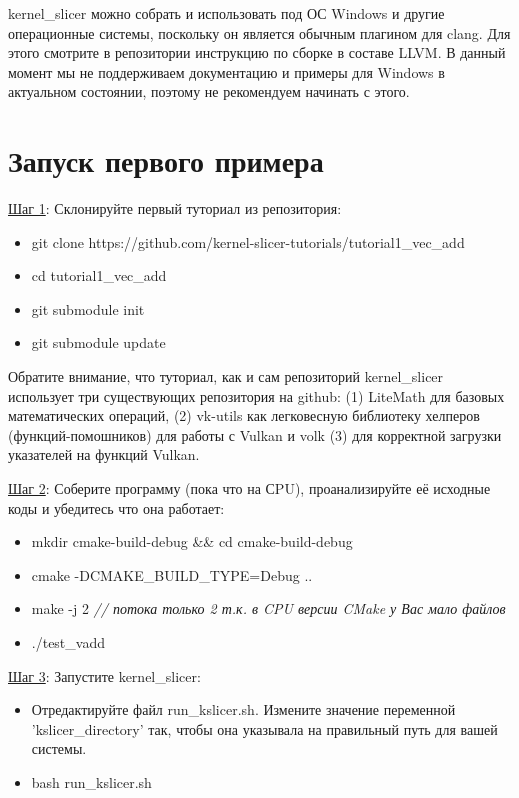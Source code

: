 \documentclass[11pt,fleqn,english,russian]{report} %
\begin{document}
\begin{remark}
	kernel\_slicer можно собрать и использовать под ОС Windows и другие операционные системы, поскольку он является обычным плагином для clang. Для этого смотрите в репозитории инструкцию по сборке в составе LLVM. В данный момент мы не поддерживаем документацию и примеры для Windows в актуальном состоянии, поэтому не рекомендуем начинать с этого. 
\end{remark}

\pagebreak
\section{Запуск первого примера}

\underline{Шаг 1}: Склонируйте первый туториал из репозитория:

\begin{itemize}
	\item git clone https://github.com/kernel-slicer-tutorials/tutorial1\_vec\_add
	\item cd tutorial1\_vec\_add
	\item git submodule init
	\item git submodule update
\end{itemize}

\vspace*{5px}
Обратите внимание, что туториал, как и сам репозиторий kernel\_slicer использует три существующих репозитория на github: (1) LiteMath для базовых математических операций, (2) vk-utils как легковесную библиотеку хелперов (функций-помошников) для работы с Vulkan и volk (3) для корректной загрузки указателей на функций Vulkan.

\vspace*{5px}
\noindent\underline{Шаг 2}: Соберите программу (пока что на СPU), проанализируйте её исходные коды и убедитесь что она работает: 
\begin{itemize}
	\item mkdir cmake-build-debug \&\& cd cmake-build-debug
	\item cmake -DCMAKE\_BUILD\_TYPE=Debug ..
	\item make -j 2 \textit{// потока только 2  т.к. в CPU версии CMake у Вас мало файлов} 
	\item ./test\_vadd 
\end{itemize}

\vspace*{5px}
\noindent\underline{Шаг 3}: Запустите kernel\_slicer:
\begin{itemize}
	\item Отредактируйте файл run\_kslicer.sh. Измените значение переменной 'kslicer\_directory' так, чтобы она указывала на правильный путь для вашей системы.
	\item bash run\_kslicer.sh 
\end{itemize}
\end{document}
